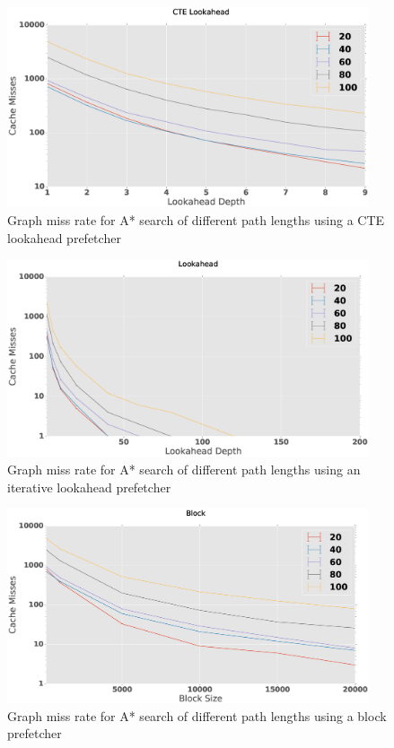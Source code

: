 \begin{figure}[htbp]
	\centering
	\includegraphics[width=0.95\textwidth]{figs/prefetch-misses-CTE.eps}
	\caption{Graph miss rate for A* search of different path lengths using a CTE lookahead prefetcher}
	\label{fig:prefetch-miss-CTE}
\end{figure}
\begin{figure}[htbp]
	\centering
	\includegraphics[width=0.95\textwidth]{figs/prefetch-misses-itr.eps}
	\caption{Graph miss rate for A* search of different path lengths using an iterative lookahead prefetcher}
	\label{fig:prefetch-miss-lookahead}
\end{figure}
\begin{figure}[htbp]
	\centering
	\includegraphics[width=0.95\textwidth]{figs/prefetch-misses-block.eps}
	\caption{Graph miss rate for A* search of different path lengths using a block prefetcher}
	\label{fig:prefetch-miss-block}
\end{figure}
